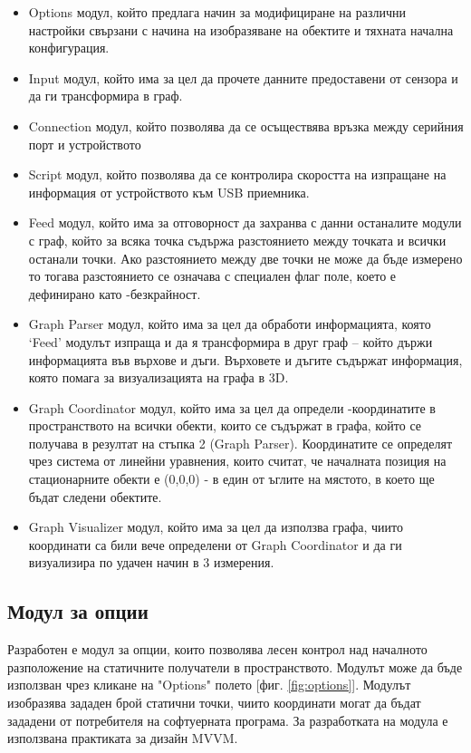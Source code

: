 \begin{itemize}
    \item Options модул, който предлага начин за модифициране на различни настройки свързани с начина на изобразяване на обектите и тяхната начална конфигурация.
    \item Input модул, който има за цел да прочете данните предоставени от сензора и да ги трансформира в граф.
    \item Connection модул, който позволява да се осъществява връзка между серийния порт и устройството
    \item Script модул, който позволява да се контролира скоростта на изпращане на информация от устройството към USB приемника.
    \item Feed  модул, който има за отговорност да захранва с данни останалите модули с граф, който за всяка точка съдържа разстоянието между точката и всички останали точки. Ако разстоянието между две точки не може да бъде измерено то тогава разстоянието се означава с специален флаг поле, което е дефинирано като -безкрайност.
    \item Graph Parser модул, който има за цел да обработи информацията, която ‘Feed’ модулът изпраща и да я трансформира в друг граф – който държи информацията във върхове и дъги. Върховете и дъгите съдържат информация, която помага за визуализацията на графа в 3D.
    \item Graph Coordinator модул, който има за цел да определи -координатите в пространството на всички обекти, които се съдържат в графа, който се получава в резултат на стъпка 2 (Graph Parser). Координатите се определят чрез система от линейни уравнения, които считат, че началната позиция на стационарните обекти е (0,0,0) - в един от ъглите на мястото, в което ще бъдат следени обектите.
    \item Graph Visualizer модул, който има за цел да използва графа, чиито координати са били вече определени от Graph Coordinator и да ги визуализира по удачен начин в 3 измерения.

\end{itemize}

\pagebreak

\subsection{Модул за опции}
Разработен е модул за опции, които позволява лесен контрол над началното разположение на статичните получатели в пространството. Модулът може да бъде използван чрез кликане на "Options" полето [фиг. \ref{fig:options}]. Модулът изобразява зададен брой статични точки, чиито координати могат да бъдат зададени от потребителя на софтуерната програма. За разработката на модула е използвана практиката за дизайн MVVM. 

